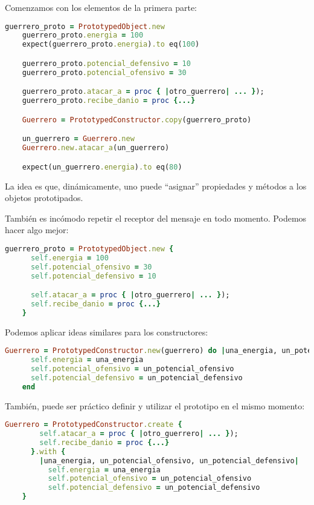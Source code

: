 \documentclass[spanish,a4paper]{article}
\begin{document}
\bigskip

Comenzamos con los elementos de la primera parte:
\begin{lstlisting}[language=Ruby]
	guerrero_proto = PrototypedObject.new
	guerrero_proto.energia = 100
	expect(guerrero_proto.energia).to eq(100)

	guerrero_proto.potencial_defensivo = 10
	guerrero_proto.potencial_ofensivo = 30

	guerrero_proto.atacar_a = proc { |otro_guerrero| ... });
	guerrero_proto.recibe_danio = proc {...}

	Guerrero = PrototypedConstructor.copy(guerrero_proto)

	un_guerrero = Guerrero.new
	Guerrero.new.atacar_a(un_guerrero)

	expect(un_guerrero.energia).to eq(80)
\end{lstlisting}
  
  La idea es que, dinámicamente, uno puede “asignar” propiedades y métodos a los objetos prototipados.

\bigskip

También es incómodo repetir el receptor del mensaje en todo momento. Podemos hacer algo mejor:
\newpage

\begin{lstlisting}[language=Ruby]
	guerrero_proto = PrototypedObject.new {
	  self.energia = 100
	  self.potencial_ofensivo = 30
	  self.potencial_defensivo = 10

	  self.atacar_a = proc { |otro_guerrero| ... });
	  self.recibe_danio = proc {...}
	}
\end{lstlisting}
  
  Podemos aplicar ideas similares para los constructores:
  
  
  
\begin{lstlisting}[language=Ruby]
	Guerrero = PrototypedConstructor.new(guerrero) do |una_energia, un_potencial_ofensivo, un_potencial_defensivo|
	  self.energia = una_energia
	  self.potencial_ofensivo = un_potencial_ofensivo
	  self.potencial_defensivo = un_potencial_defensivo
	end
\end{lstlisting}
También, puede ser práctico definir y utilizar el prototipo en el mismo momento:
\begin{lstlisting}[language=Ruby]
	Guerrero = PrototypedConstructor.create {
		self.atacar_a = proc { |otro_guerrero| ... });
		self.recibe_danio = proc {...}
	  }.with {
		|una_energia, un_potencial_ofensivo, un_potencial_defensivo|
		  self.energia = una_energia
		  self.potencial_ofensivo = un_potencial_ofensivo
		  self.potencial_defensivo = un_potencial_defensivo
	}
\end{lstlisting}
\end{document}
